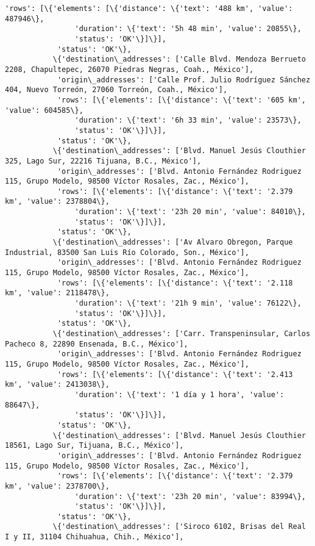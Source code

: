 \documentclass[11pt]{article}
\begin{document}
\begin{Verbatim}[commandchars=\\\{\}]
            'rows': [\{'elements': [\{'distance': \{'text': '488 km', 'value': 487946\},
                'duration': \{'text': '5h 48 min', 'value': 20855\},
                'status': 'OK'\}]\}],
            'status': 'OK'\},
           \{'destination\_addresses': ['Calle Blvd. Mendoza Berrueto 2208, Chapultepec, 26070 Piedras Negras, Coah., México'],
            'origin\_addresses': ['Calle Prof. Julio Rodríguez Sánchez 404, Nuevo Torreón, 27060 Torreón, Coah., México'],
            'rows': [\{'elements': [\{'distance': \{'text': '605 km', 'value': 604585\},
                'duration': \{'text': '6h 33 min', 'value': 23573\},
                'status': 'OK'\}]\}],
            'status': 'OK'\},
           \{'destination\_addresses': ['Blvd. Manuel Jesús Clouthier 325, Lago Sur, 22216 Tijuana, B.C., México'],
            'origin\_addresses': ['Blvd. Antonio Fernández Rodriguez 115, Grupo Modelo, 98500 Víctor Rosales, Zac., México'],
            'rows': [\{'elements': [\{'distance': \{'text': '2.379 km', 'value': 2378804\},
                'duration': \{'text': '23h 20 min', 'value': 84010\},
                'status': 'OK'\}]\}],
            'status': 'OK'\},
           \{'destination\_addresses': ['Av Alvaro Obregon, Parque Industrial, 83500 San Luis Río Colorado, Son., México'],
            'origin\_addresses': ['Blvd. Antonio Fernández Rodriguez 115, Grupo Modelo, 98500 Víctor Rosales, Zac., México'],
            'rows': [\{'elements': [\{'distance': \{'text': '2.118 km', 'value': 2118478\},
                'duration': \{'text': '21h 9 min', 'value': 76122\},
                'status': 'OK'\}]\}],
            'status': 'OK'\},
           \{'destination\_addresses': ['Carr. Transpeninsular, Carlos Pacheco 8, 22890 Ensenada, B.C., México'],
            'origin\_addresses': ['Blvd. Antonio Fernández Rodriguez 115, Grupo Modelo, 98500 Víctor Rosales, Zac., México'],
            'rows': [\{'elements': [\{'distance': \{'text': '2.413 km', 'value': 2413038\},
                'duration': \{'text': '1 día y 1 hora', 'value': 88647\},
                'status': 'OK'\}]\}],
            'status': 'OK'\},
           \{'destination\_addresses': ['Blvd. Manuel Jesús Clouthier 18561, Lago Sur, Tijuana, B.C., México'],
            'origin\_addresses': ['Blvd. Antonio Fernández Rodriguez 115, Grupo Modelo, 98500 Víctor Rosales, Zac., México'],
            'rows': [\{'elements': [\{'distance': \{'text': '2.379 km', 'value': 2378700\},
                'duration': \{'text': '23h 20 min', 'value': 83994\},
                'status': 'OK'\}]\}],
            'status': 'OK'\},
           \{'destination\_addresses': ['Siroco 6102, Brisas del Real I y II, 31104 Chihuahua, Chih., México'],

\end{Verbatim}
\end{document}
